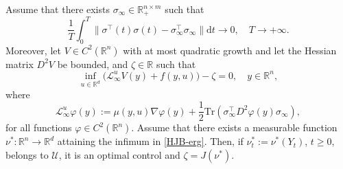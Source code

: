 \documentclass[10pt,a4paper]{amsart}
\newcommand{\D}{\mathrm{d}}
\begin{document}
\begin{theorem} Assume that there exists $\sigma_\infty \in \mathbb R_+^{n \times m}$ such that
\begin{equation}\label{lim-sigma} \frac{1}{T}\int_0 ^T \| \sigma^\top (t)\sigma (t) - \sigma^\top _\infty\sigma_\infty \| \D t \to 0, \quad T \to +\infty.\end{equation}
Moreover, let $V \in C^2 (\mathbb R^n)$ with at most quadratic growth and let the Hessian matrix $D^2 V$ be bounded, and $\zeta \in \mathbb R$ such that
\begin{equation}\label{HJB-erg}
\inf_{u \in \mathbb R^d} \big (\mathcal L_\infty ^u V(y) + f(y,u)\big) - \zeta = 0, \quad y \in \mathbb R^n,
\end{equation}
where
\[ \mathcal L_\infty ^{u} \varphi (y):= \mu(y,u) \nabla \varphi (y) + \frac12 \text{Tr} \left( \sigma^\top _\infty D^2 \varphi(y) \sigma_\infty \right) ,\]
for all functions $\varphi \in C^2(\mathbb R^n)$.
Assume that there exists a measurable function $\nu^*: \mathbb R^n \to \mathbb R^d$ attaining the infimum in \eqref{HJB-erg}. 
Then, if $\nu^*_t := \nu^*(Y_t)$, $t\geq 0$, belongs to $\mathcal U$, it is an optimal control and $\zeta = J(\nu^*)$.
\end{theorem}
\end{document}
